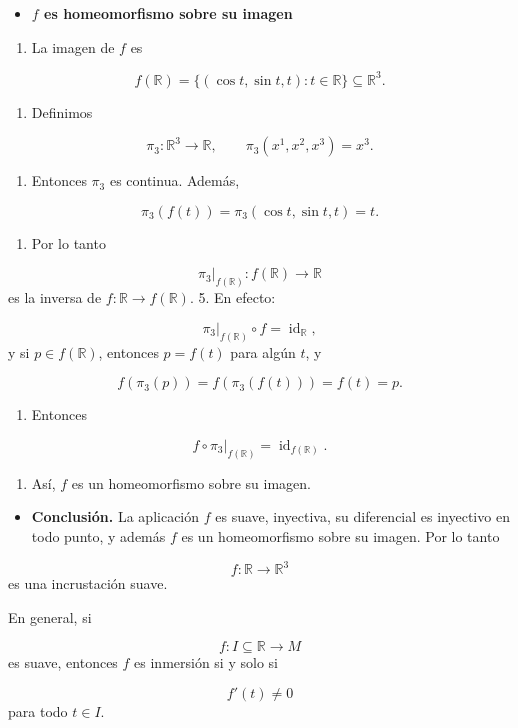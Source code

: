 \begin{bookproof}{}
\begin{itemize}
\item \textbf{$f$ es homeomorfismo sobre su imagen}
\end{itemize}
\begin{enumerate}
\item La imagen de $f$ es
\end{enumerate}
\[
f(\mathbb R)=\{(\cos t,\sin t,t):t\in\mathbb R\}\subseteq\mathbb R^3.
\]
\begin{enumerate}[start=2]
\item Definimos
\end{enumerate}
\[
\pi_3:\mathbb R^3\to\mathbb R,\qquad \pi_3(x^1,x^2,x^3)=x^3.
\]
\begin{enumerate}[start=3]
\item Entonces $\pi_3$ es continua. Además,
\end{enumerate}
\[
\pi_3(f(t))=\pi_3(\cos t,\sin t,t)=t.
\]
\begin{enumerate}[start=4]
\item Por lo tanto
\end{enumerate}
\[
\pi_3|_{f(\mathbb R)}:f(\mathbb R)\to\mathbb R
\]
es la inversa de $f:\mathbb R\to f(\mathbb R)$. 5. En efecto:

\[
\pi_3|_{f(\mathbb R)}\circ f=\operatorname{id}_{\mathbb R},
\]
y si $p\in f(\mathbb R)$, entonces $p=f(t)$ para algún $t$, y

\[
f(\pi_3(p))=f(\pi_3(f(t)))=f(t)=p.
\]
\begin{enumerate}[start=6]
\item Entonces
\end{enumerate}
\[
f\circ \pi_3|_{f(\mathbb R)}=\operatorname{id}_{f(\mathbb R)}.
\]
\begin{enumerate}[start=7]
\item Así, $f$ es un homeomorfismo sobre su imagen.
\end{enumerate}
\begin{itemize}
\item \textbf{Conclusión.} La aplicación $f$ es suave, inyectiva, su diferencial es inyectivo en todo punto, y además $f$ es un homeomorfismo sobre su imagen. Por lo tanto
\end{itemize}
\[
f:\mathbb R\to\mathbb R^3
\]
es una incrustación suave.

\bookqed
\end{bookproof}
\begin{bookexercise}{}
En general, si

\[
f:I\subseteq\mathbb R\to M
\]
es suave, entonces $f$ es inmersión si y solo si

\[
f'(t)\neq 0
\]
para todo $t\in I$.

\end{bookexercise}
